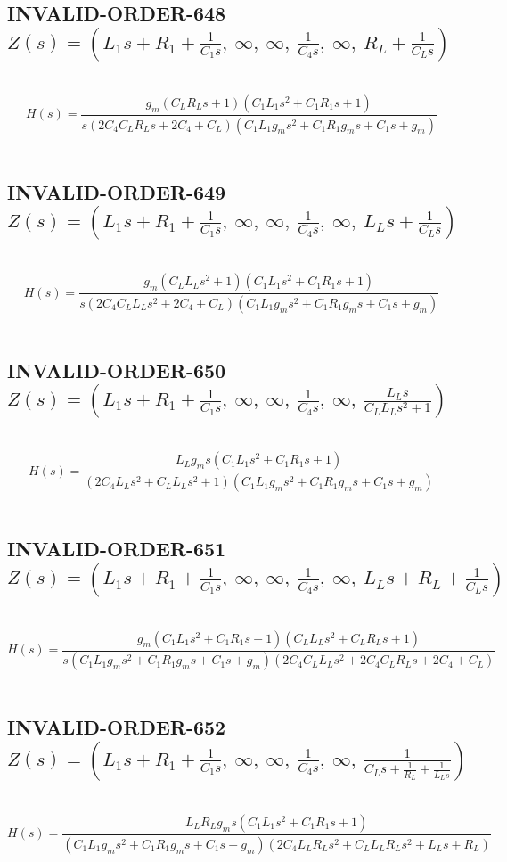 \documentclass{article}
\begin{document}
\subsection{INVALID-ORDER-648 $Z(s) = \left( L_{1} s + R_{1} + \frac{1}{C_{1} s}, \  \infty, \  \infty, \  \frac{1}{C_{4} s}, \  \infty, \  R_{L} + \frac{1}{C_{L} s}\right)$ } \ 
\textbf{\[H(s) = \frac{g_{m} \left(C_{L} R_{L} s + 1\right) \left(C_{1} L_{1} s^{2} + C_{1} R_{1} s + 1\right)}{s \left(2 C_{4} C_{L} R_{L} s + 2 C_{4} + C_{L}\right) \left(C_{1} L_{1} g_{m} s^{2} + C_{1} R_{1} g_{m} s + C_{1} s + g_{m}\right)}\] } \ 
\subsection{INVALID-ORDER-649 $Z(s) = \left( L_{1} s + R_{1} + \frac{1}{C_{1} s}, \  \infty, \  \infty, \  \frac{1}{C_{4} s}, \  \infty, \  L_{L} s + \frac{1}{C_{L} s}\right)$ } \ 
\textbf{\[H(s) = \frac{g_{m} \left(C_{L} L_{L} s^{2} + 1\right) \left(C_{1} L_{1} s^{2} + C_{1} R_{1} s + 1\right)}{s \left(2 C_{4} C_{L} L_{L} s^{2} + 2 C_{4} + C_{L}\right) \left(C_{1} L_{1} g_{m} s^{2} + C_{1} R_{1} g_{m} s + C_{1} s + g_{m}\right)}\] } \ 
\subsection{INVALID-ORDER-650 $Z(s) = \left( L_{1} s + R_{1} + \frac{1}{C_{1} s}, \  \infty, \  \infty, \  \frac{1}{C_{4} s}, \  \infty, \  \frac{L_{L} s}{C_{L} L_{L} s^{2} + 1}\right)$ } \ 
\textbf{\[H(s) = \frac{L_{L} g_{m} s \left(C_{1} L_{1} s^{2} + C_{1} R_{1} s + 1\right)}{\left(2 C_{4} L_{L} s^{2} + C_{L} L_{L} s^{2} + 1\right) \left(C_{1} L_{1} g_{m} s^{2} + C_{1} R_{1} g_{m} s + C_{1} s + g_{m}\right)}\] } \ 
\subsection{INVALID-ORDER-651 $Z(s) = \left( L_{1} s + R_{1} + \frac{1}{C_{1} s}, \  \infty, \  \infty, \  \frac{1}{C_{4} s}, \  \infty, \  L_{L} s + R_{L} + \frac{1}{C_{L} s}\right)$ } \ 
\textbf{\[H(s) = \frac{g_{m} \left(C_{1} L_{1} s^{2} + C_{1} R_{1} s + 1\right) \left(C_{L} L_{L} s^{2} + C_{L} R_{L} s + 1\right)}{s \left(C_{1} L_{1} g_{m} s^{2} + C_{1} R_{1} g_{m} s + C_{1} s + g_{m}\right) \left(2 C_{4} C_{L} L_{L} s^{2} + 2 C_{4} C_{L} R_{L} s + 2 C_{4} + C_{L}\right)}\] } \ 
\subsection{INVALID-ORDER-652 $Z(s) = \left( L_{1} s + R_{1} + \frac{1}{C_{1} s}, \  \infty, \  \infty, \  \frac{1}{C_{4} s}, \  \infty, \  \frac{1}{C_{L} s + \frac{1}{R_{L}} + \frac{1}{L_{L} s}}\right)$ } \ 
\textbf{\[H(s) = \frac{L_{L} R_{L} g_{m} s \left(C_{1} L_{1} s^{2} + C_{1} R_{1} s + 1\right)}{\left(C_{1} L_{1} g_{m} s^{2} + C_{1} R_{1} g_{m} s + C_{1} s + g_{m}\right) \left(2 C_{4} L_{L} R_{L} s^{2} + C_{L} L_{L} R_{L} s^{2} + L_{L} s + R_{L}\right)}\] } \ 
\end{document}
